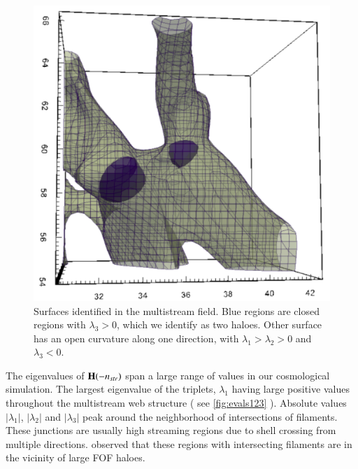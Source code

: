 \begin{figure}
\begin{minipage}[t]{.99\linewidth}
  \centering\includegraphics[width=6.cm]{Chapter4/Source_v2/fig9.pdf} 
\end{minipage}\hfill
\caption{Surfaces identified in the multistream field. Blue regions are closed regions with $\lambda_3 > 0 $, which we identify as two haloes. Other surface has an open curvature along one direction, with $\lambda_1 > \lambda_2 > 0$ and $ \lambda_3 < 0$. }
\label{fig:SmallBox}
\end{figure}

The eigenvalues of ${\bf H}(-n_{str})$ span a large range of values in our cosmological simulation. The largest eigenvalue of the triplets, $\lambda_1$ having large positive values throughout the multistream web structure ( see \autoref{fig:evals123} ). Absolute values $|\lambda_1|$, $|\lambda_2|$ and $|\lambda_3|$ peak around the neighborhood of intersections of filaments. These junctions are usually high streaming regions due to shell crossing from multiple directions. \cite{Ramachandra2015} observed that these regions with intersecting filaments are in the vicinity of large FOF haloes. 

